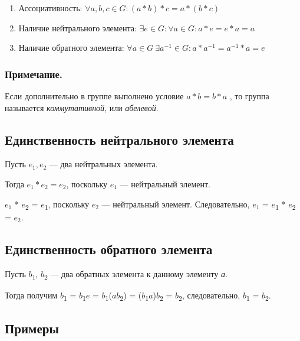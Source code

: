 \documentclass[12pt]{article}
\begin{document}
    \begin{enumerate}
        \item
              Ассоциативность: $\forall a, b, c \in G: (a * b) * c = a * (b * c)$

        \item
              Наличие нейтрального элемента: $\exists e \in G : \forall a \in G: a * e = e * a = a$

        \item
              Наличие обратного элемента: $\forall a \in G \ \exists a^{−1}\in G: a * a^{−1} = a^{−1} * a = e$
    \end{enumerate}

    \subsubsection{Примечание.}

    Если дополнительно в группе выполнено условие $a * b = b * a$ , то группа
    называется \emph{коммутативной}, или \emph{абелевой}.

    \subsection{Единственность нейтрального элемента}

    Пусть $e_{1}, e_{2}$ --- два нейтральных элемента.

    Тогда $e_{1} * e_{2} = e_{2}$, поскольку $e_{1}$ --- нейтральный элемент.

$e_{1}$ * $e$\textsubscript{2} = $e$\textsubscript{1}, поскольку
$e_{2}$ --- нейтральный элемент. Следовательно,
$e_{1}$ = $e$\textsubscript{1} * $e$\textsubscript{2} =
$e_{2}$.

    \subsection{Единственность обратного
        элемента}

    Пусть $b$\textsubscript{1}, $b$\textsubscript{2} --- два обратных элемента к
    данному элементу \emph{а}.

    Тогда получим $b$\textsubscript{1} = $b$\textsubscript{1}$e$ =
$b$\textsubscript{1}($a$$b$\textsubscript{2}) =
    ($b$\textsubscript{1}$a$)$b$\textsubscript{2} = $b$\textsubscript{2},
    следовательно, $b$\textsubscript{1} = $b$\textsubscript{2}.

    \subsection{Примеры}
\end{document}
